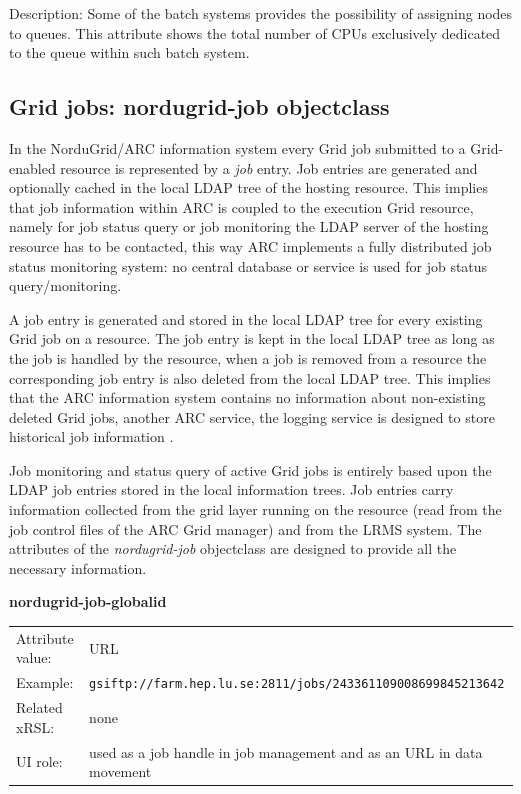 \documentclass{article}
\begin{document}
Description: 
Some of the batch systems provides the possibility of assigning 
nodes to queues. This attribute shows the total number of CPUs 
exclusively dedicated to the queue within such batch system.


\subsection{Grid jobs: nordugrid-job objectclass}

In the NorduGrid/ARC information system every Grid job submitted to
a Grid-enabled resource is represented by a \emph{job} entry.
Job entries are generated and optionally cached in the local LDAP tree
of the hosting resource. This implies that job information within ARC is 
coupled to the execution Grid resource, namely for job status query or
job monitoring the LDAP server of the hosting resource has to be contacted,
this way ARC implements a fully distributed job status monitoring system:
no central database or service is used for job status query/monitoring.

A job entry is generated and stored in the local LDAP tree for every 
existing Grid job on a resource. The job entry is kept in the local LDAP tree as long as the
job is handled by the resource, when a job is removed from a resource 
the corresponding  job entry is also deleted from the local LDAP tree.
This implies that the ARC information system contains no information about 
non-existing deleted Grid jobs, another  ARC service, the logging service is 
designed to store historical job information \cite{logger}.

Job monitoring and status query of active Grid jobs is entirely based upon the 
LDAP job entries stored in the local information trees. 
Job entries carry information collected from the 
grid layer running on the resource (read from the job control files
of the ARC Grid manager) and from the LRMS system.
The attributes of the {\it nordugrid-job} objectclass are designed to 
provide all the necessary information.


  \hspace*{0.5cm}
  \begin{shaded}
    \textbf{nordugrid-job-globalid}
  \end{shaded}
  \begin{tabular}{lp{10cm}}  
    Attribute value:& URL\\
    Example:& \verb#gsiftp://farm.hep.lu.se:2811/jobs/243361109008699845213642#\\
    Related xRSL:& none\\
    UI role:&  used as a job handle in job management and as an URL in data movement\\
  \end{tabular}
\end{document}
